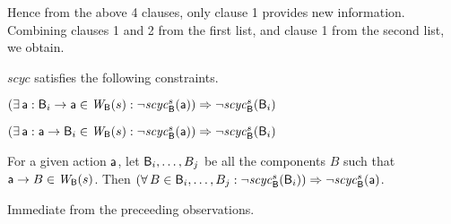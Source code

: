 \en
Hence from the above 4 clauses, only clause 1 provides new information. 
Combining clauses 1 and 2 from the first list, and clause 1 from the second list, we obtain.


\label{prop:sc-membership}
$scyc$ satisfies the following constraints.
\bn

\item \label{prop:sc-membership:comp-out}
$(\exists\, \mathsf{a}: \mathsf{B}_i \rightarrow \mathsf{a} \in \mathit{W}_{\mathsf{B}}({s}) : \neg \mathit{scyc}_{\mathsf{B}}^{s}({\mathsf{a}})) \Rightarrow \neg \mathit{scyc}_{\mathsf{B}}^{s}({\mathsf{B}_i})$

\item \label{prop:sc-membership:comp-in}
$(\exists\, \mathsf{a}: \mathsf{a} \rightarrow \mathsf{B}_i \in \mathit{W}_{\mathsf{B}}({s}): \neg \mathit{scyc}_{\mathsf{B}}^{s}({\mathsf{a}})) \Rightarrow \neg \mathit{scyc}_{\mathsf{B}}^{s}({\mathsf{B}_i})$


\item \label{prop:sc-membership:act-out}
For a given action $\mathsf{a}$, let $\mathsf{B}_i,\ldots,B_j$ be all the components $B$ such that $\mathsf{a} \rightarrow B \in \mathit{W}_{\mathsf{B}}({s})$.
Then $(\forall\, B \in \mathsf{B}_i,\ldots,B_j: \neg \mathit{scyc}_{\mathsf{B}}^{s}({\mathsf{B}_i})) \Rightarrow \neg \mathit{scyc}_{\mathsf{B}}^{s}({\mathsf{a}})$.
\en

\ep
%
\bpr
Immediate from the preceeding observations.
\epr



\remove{
\bn



\en 
}

